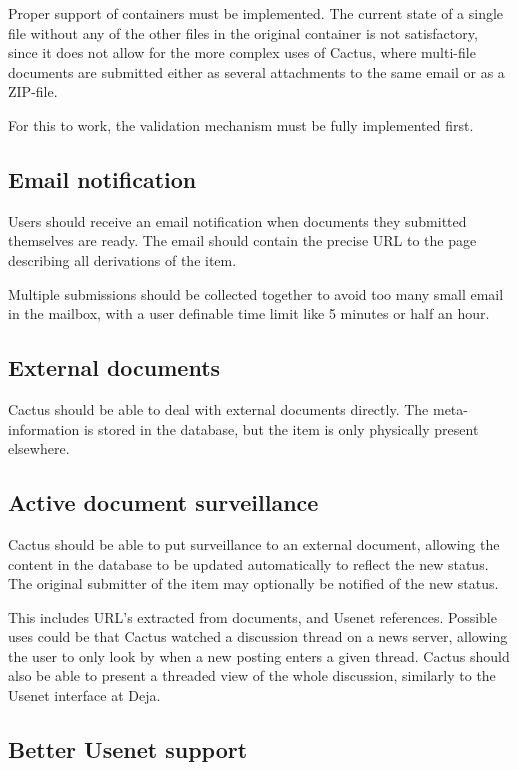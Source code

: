 Proper support of containers must be implemented.  The current state
of a single file without any of the other files in the original
container is not satisfactory, since it does not allow for the more
complex uses of Cactus, where multi-file documents are submitted
either as several attachments to the same email or as a ZIP-file.

For this to work, the validation mechanism must be fully implemented
first.

\subsection*{Email notification}

Users should receive an email notification when documents they
submitted themselves are ready.  The email should contain the precise
URL to the page describing all derivations of the item.

Multiple submissions should be collected together to avoid too many
small email in the mailbox, with a user definable time limit like 5
minutes or half an hour.


\subsection*{External documents}

Cactus should be able to deal with external documents directly.  The
meta-information is stored in the database, but the item is only
physically present elsewhere.

\subsection*{Active document surveillance}

Cactus should be able to put surveillance to an external document,
allowing the content in the database to be updated automatically to
reflect the new status.  The original submitter of the item may
optionally be notified of the new status.

This includes URL's extracted from documents, and Usenet references.
Possible uses could be that Cactus watched a discussion thread on a
news server, allowing the user to only look by when a new posting
enters a given thread.   Cactus should also be able to present a
threaded view of the whole discussion, similarly to the Usenet
interface at Deja.

\subsection*{Better Usenet support}

